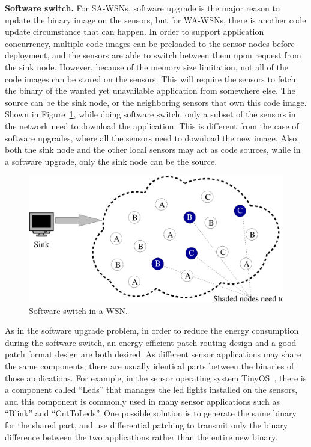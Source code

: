 \textbf{Software switch.}
For SA-WSNs, software upgrade is the major reason to update the binary image on the sensors, but for WA-WSNs, there is another code update circumstance that can happen.
In order to support application concurrency, multiple code images can be preloaded to the sensor nodes before deployment, and the sensors are able to switch between them upon request from the sink node. However, because of the memory size limitation, not all of the code images can be stored on the sensors. This will require the sensors to fetch the binary of the wanted yet unavailable application from somewhere else. The source can be the sink node, or the neighboring sensors that own this code image. Shown in Figure~\ref{fig:switch}, while doing software switch, only a subset of the sensors in the network need to download the application.
This is different from the case of software upgrades, where all the sensors need to download the new image. Also, both the sink node and the other local sensors may act as code sources, while in a software upgrade, only the sink node can be the source.
\begin{figure}[htbp]
	\centering
		\includegraphics[scale=0.45]{figures/switch.eps}
	\caption{Software switch in a WSN.}
	\label{fig:switch}
\end{figure}

As in the software upgrade problem, in order to reduce the energy consumption during the software switch, an energy-efficient patch routing design and a good patch format design are both desired. 
As different sensor applications may share the same components, there are usually identical parts between the binaries of those applications. For example, in the sensor operating system TinyOS~\cite{tinyos}, there is a component called ``Leds'' that manages the led lights installed on the sensors, and this component is commonly used in many sensor applications such as ``Blink'' and ``CntToLeds''. 
One possible solution is to generate the same binary for the shared part, and use differential patching to transmit only the binary difference between the two applications rather than the entire new binary.

